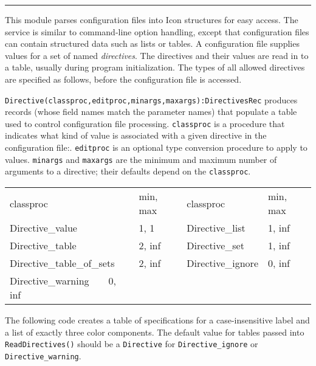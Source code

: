 \vspace{0.25cm}\hrule{}

This module parses configuration files into Icon
structures for easy access. The service is similar to 
command-line option handling, except that configuration files can
contain structured data such as lists or tables. A configuration file
supplies values for a set of named \textit{directives}. The directives
and their values are read in to a table, usually during program
initialization. The types of all allowed directives are specified as
follows, before the configuration file is accessed.

\texttt{Directive(classproc,editproc,minargs,maxargs):DirectivesRec}
produces records (whose field names match the parameter names) that
populate a table used to control configuration file processing.
\texttt{classproc} is a procedure that indicates what kind of value is
associated with a given directive in the configuration file:.
\texttt{editproc} is an optional type conversion procedure to apply to
values. \texttt{minargs} and \texttt{maxargs} are the minimum and
maximum number of arguments to a directive; their defaults depend on
the \texttt{classproc}.

\begin{supertabular}{m{2.0in} m{0.9in} m{2.0in} m{0.9in}}
classproc & min, max & classproc & min, max \\
Directive\_value & 1, 1 & Directive\_list & 1, inf \\
Directive\_table & 2, inf & Directive\_set & 1, inf\\
Directive\_table\_of\_sets & 2, inf & Directive\_ignore & 0, inf\\
Directive\_warning\ \ \ \ 0, inf \\
\end{supertabular}

The following code creates a table of specifications for a
case-insensitive label and a list of exactly three color components.
The default value for tables passed into \texttt{ReadDirectives()}
should be a \texttt{Directive} for \texttt{Directive\_ignore} or
\texttt{Directive\_warning}.


